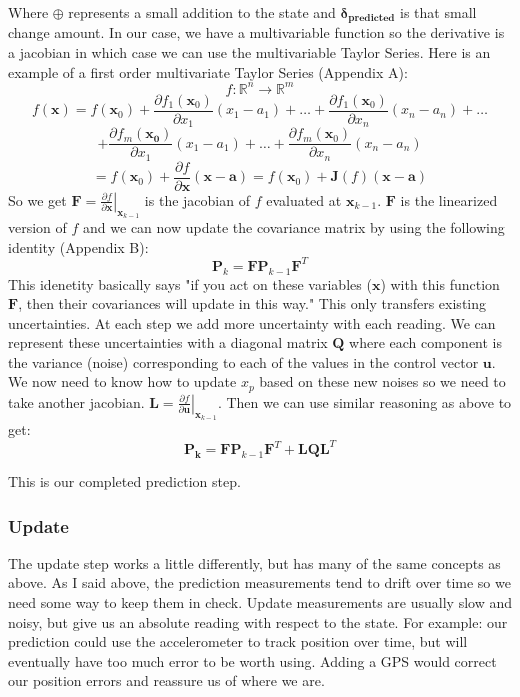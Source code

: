 \documentclass[11pt]{article}
\newcommand{\R}{\mathbb{R}}
\renewcommand{\vec}[1]{\mathbf{#1}}
\newcommand{\mat}[1]{\mathbf{#1}}
\begin{document}
Where $\oplus$ represents a small addition to the state and $\vec{\delta_{predicted}}$ is that small change amount. In our case, we have a multivariable function so the derivative is a jacobian in which case we can use the multivariable Taylor Series. Here is an example of a first order multivariate Taylor Series (Appendix A):
$$f: \R^n \to \R^m$$
$$f(\vec{x}) = f(\vec{x}_0) + \frac{\partial f_1(\vec{x}_0)}{\partial x_1}(x_1 - a_1) + \dots + \frac{\partial f_1(\vec{x}_0)}{\partial x_n}(x_n - a_n) + \dots $$ 
$$+ \frac{\partial f_m(\vec{x_0})}{\partial x_1}(x_1 - a_1) + \dots + \frac{\partial f_m(\vec{x}_0)}{\partial x_n}(x_n - a_n)$$
$$= f(\vec{x}_0) + \frac{\partial f}{\partial \vec{x}}(\vec{x}- \vec{a}) = f(\vec{x}_0) + \mat{J}(f)(\vec{x}-\vec{a})$$
So we get $\mat{F} = \left.\frac{\partial f}{\partial \vec{x}}\right|_{\vec{x}_{k-1}}$ is the jacobian of $f$ evaluated at $\vec{x}_{k-1}$. $\mat{F}$ is the linearized version of $f$ and we can now update the covariance matrix by using the following identity (Appendix B):
$$\mat{P}_{k} = \mat{F} \mat{P}_{k-1} \mat{F}^T$$
This idenetity basically says "if you act on these variables ($\vec{x}$) with this function $\mat{F}$, then their covariances will update in this way." This only transfers existing uncertainties. At each step we add more uncertainty with each reading. We can represent these uncertainties with a diagonal matrix $\mat{Q}$ where each component is the variance (noise) corresponding to each of the values in the control vector $\vec{u}$. We now need to know how to update $x_p$ based on these new noises so we need to take another jacobian.
$\mat{L} = \left.\frac{\partial f}{\partial \vec{u}}\right|_{\vec{x}_{k-1}}$. Then we can use similar reasoning as above to get:
$$\mat{P_k} = \mat{F} \mat{P}_{k-1} \mat{F}^T + \mat{L} \mat{Q} \mat{L}^T$$

This is our completed prediction step.
\subsubsection{Update}
The update step works a little differently, but has many of the same concepts as above. As I said above, the prediction measurements tend to drift over time so we need some way to keep them in check. Update measurements are usually slow and noisy, but give us an absolute reading with respect to the state. For example: our prediction could use the accelerometer to track position over time, but will eventually have too much error to be worth using. Adding a GPS would correct our position errors and reassure us of where we are. 
\end{document}
